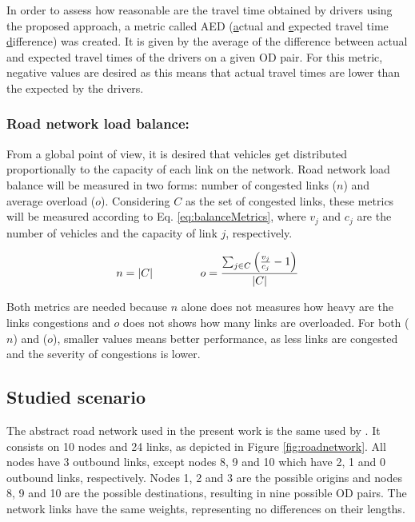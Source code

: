 \documentclass{RITA}
\newcommand{\linkCap}{\ensuremath{c_j}}		%
\newcommand{\veh}{\ensuremath{v}}		%
\newcommand{\congRoads}{\ensuremath{C}}		%
\newcommand{\numCong}{\ensuremath{n}}		%
\newcommand{\overLoadFactor}{\ensuremath{o}}	%
\begin{document}
In order to assess how reasonable are the travel time obtained by drivers using the proposed approach, a metric called AED (\underline{a}ctual and \underline{e}xpected travel time \underline{d}ifference) was created. It is given by the average of the difference between actual and expected travel times of the drivers on a given OD pair. For this metric, negative values are desired as this means that actual travel times are lower than the expected by the drivers.

\subsubsection{Road network load balance:}

From a global point of view, it is desired that vehicles get distributed proportionally to the capacity of each link on the network. Road network load balance will be measured in two forms: number of congested links ($n$) and average overload ($o$). Considering $C$ as the set of congested links, these metrics will be measured according to Eq. \eqref{eq:balanceMetrics}, where $\veh_j$ and $\linkCap$ are the number of vehicles and the capacity of link $j$, respectively. 

\begin{equation}
\label{eq:balanceMetrics}
\numCong = |\congRoads| \hspace{1.5cm}  \overLoadFactor = \frac{ \sum_{\substack{j \in \congRoads}} \left(\frac{\veh_j}{\linkCap} -1 \right)}{|C|}
\end{equation}

Both metrics are needed because $n$ alone does not measures how heavy are the links congestions and $o$ does not shows how many links are overloaded. For both ($n$) and ($o$), smaller values means better performance, as less links are congested and the severity of congestions is lower.

\subsection{Studied scenario} 

The abstract road network used in the present work is the same used by \cite{Galib&Moser2011}. It consists on 10 nodes and 24 links, as depicted in Figure \ref{fig:roadnetwork}. All nodes have 3 outbound links, except nodes 8, 9 and 10 which have 2, 1 and 0 outbound links, respectively. Nodes 1, 2 and 3 are the possible origins and nodes 8, 9 and 10 are the possible destinations, resulting in nine possible OD pairs. The network links have the same weights, representing no differences on their lengths.
\end{document}
